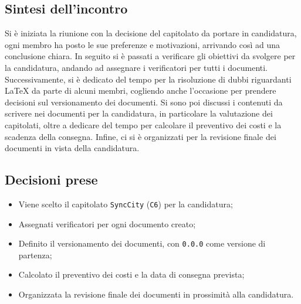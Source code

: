 \subsection{Sintesi dell'incontro}
Si è iniziata la riunione con la decisione del capitolato da portare in candidatura, ogni membro ha posto le sue preferenze e motivazioni, arrivando così ad una conclusione chiara. In seguito si è passati a verificare gli obiettivi da svolgere per la candidatura, andando ad assegnare i verificatori per tutti i documenti. Successivamente, si è dedicato del tempo per la risoluzione di dubbi riguardanti \LaTeX\: da parte di alcuni membri, cogliendo anche l'occasione per prendere decisioni sul versionamento dei documenti. Si sono poi discussi i contenuti da scrivere nei documenti per la candidatura, in particolare la valutazione dei capitolati, oltre a dedicare del tempo per calcolare il preventivo dei costi e la scadenza della consegna. Infine, ci si è organizzati per la revisione finale dei documenti in vista della candidatura.
\subsection{Decisioni prese}
\begin{itemize}
	\setlength\itemsep{0em}
	\item Viene scelto il capitolato \texttt{SyncCity} (\texttt{C6}) per la candidatura;
	\item Assegnati verificatori per ogni documento creato;
	\item Definito il versionamento dei documenti, con \texttt{0.0.0} come versione di partenza;
	\item Calcolato il preventivo dei costi e la data di consegna prevista;
	\item Organizzata la revisione finale dei documenti in prossimità alla candidatura.
	\\\\
\end{itemize}
